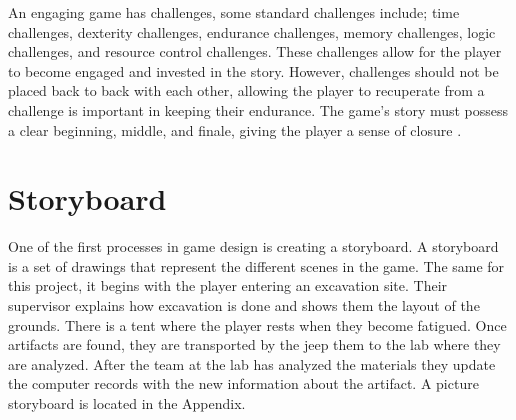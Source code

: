 An engaging game has challenges, some standard challenges include; time challenges, dexterity challenges, endurance challenges, memory challenges, logic challenges, and resource control challenges. These challenges allow for the player to become engaged and invested in the story. However, challenges should not be placed back to back with each other, allowing the player to recuperate from a challenge is important in keeping their endurance. The game's story must possess a clear beginning, middle, and finale, giving the player a sense of closure \cite{Nguyen2012}. 

\section{Storyboard}
One of the first processes in game design is creating a storyboard. A storyboard is a set of drawings that represent the different scenes in the game. The same for this project, it begins with the player entering an excavation site. Their supervisor explains how excavation is done and shows them the layout of the grounds. There is a tent where the player rests when they become fatigued. Once artifacts are found, they are transported by the jeep them to the lab where they are analyzed. After the team at the lab has analyzed the materials they update the computer records with the new  information about the artifact. A picture storyboard is located in the Appendix.                                     


